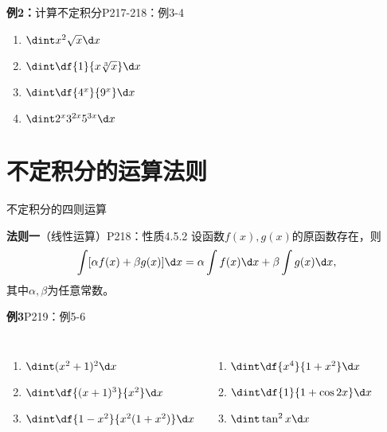 \begin{frame}
	\linespread{1.5}
	\begin{exampleblock}{{\bf 例2：}计算不定积分\hfill P217-218：例3-4}
		\begin{enumerate}
		  \item $\dint x^2\sqrt{x}\d x$\pause 
		  \item $\dint \df{1}{x\sqrt[3]{x}}\d x$\pause 
		  \item $\dint \df{4^x}{9^x}\d x$\pause 
		  \item $\dint 2^x3^{2x}5^{3x}\d x$
		\end{enumerate}
	\end{exampleblock}
\end{frame}

\section{不定积分的运算法则}

\begin{frame}{不定积分的四则运算}
	\linespread{1.2}
	\begin{block}{{\bf 法则一}（线性运算）\hfill P218：性质4.5.2}
		设函数$f(x),g(x)$的原函数存在，则
		$$\int[\alpha f(x)+\beta g(x)]\d x=\alpha\int f(x)\d x+\beta\int g(x)\d x,$$
		其中$\alpha,\beta$为任意常数。
	\end{block}
\end{frame}

\begin{frame}
	\linespread{1.5}
	\begin{exampleblock}{{\bf 例3}\hfill P219：例5-6}
		\begin{columns}
				\begin{enumerate}
				  \item $\dint (x^2+1)^2\d x$\pause 
				  \item $\dint\df{(x+1)^3}{x^2}\d x$\pause 
				  \item $\dint\df{1-x^2}{x^2(1+x^2)}\d x$\pause 
				\end{enumerate}
				 \begin{enumerate}
			        \addtocounter{enumi}{3}
				    \item $\dint \df{x^4}{1+x^2}\d x$\pause 
				    \item $\dint\df{1}{1+\cos 2x}\d x$\pause 
				    \item $\dint\tan^2 x\d x$
				 \end{enumerate}
		\end{columns}
	\end{exampleblock}
\end{frame}

